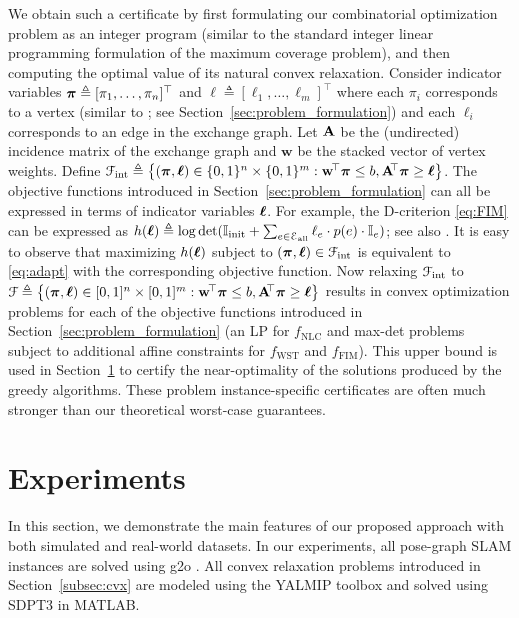 \documentclass[conference]{IEEEtran}
\begin{document}
We obtain such a certificate
by first
formulating our combinatorial optimization problem as an integer program (similar to the standard integer linear
programming formulation of the maximum
coverage problem), and then computing the optimal value of its natural
convex relaxation. 
Consider indicator variables $\boldsymbol\pi \triangleq [\pi_1,\dots,\pi_{n}]^\top$ and
$\boldsymbol{\ell}  \triangleq [\ell_1,\dots,\ell_m]^\top$ where each $\pi_i$
corresponds to a vertex (similar to \cite{Giamou18_ICRA}; see
Section~\ref{sec:problem_formulation}) and each $\ell_i$ corresponds to an edge
in the exchange graph. Let $\mathbf{A}$ be the (undirected) incidence matrix of the
exchange graph and $\mathbf{w}$ be the stacked vector of vertex weights. Define $\Fcal_{\text{int}} \triangleq \big\{(\ppp,\zz) \in \{0,1\}^n \times \{0,1\}^m
:\mathbf{w}^{\hspace{-0.05cm}\top}\ppp\leq
  b, \mathbf{A}^{\hspace{-0.1cm}\top}\ppp \geq \zz\big\}$. The objective
  functions introduced in Section~\ref{sec:problem_formulation} can all be
  expressed in terms of indicator variables $\boldsymbol{\ell}$. For example, the D-criterion \eqref{eq:FIM}
  can be expressed as $h(\boldsymbol{\ell}) \triangleq \log\det(\mathbb{I}_\text{init} + \sum_{e \in
	\mathcal{E}_\text{all}} \ell_e\cdot
  p(e) \cdot
  \mathbb{I}_e)$; see also \cite{kasra16wafr,carlone2017attention}. It is easy to observe that maximizing $h(\boldsymbol{\ell})$ subject to $(\boldsymbol\pi,\boldsymbol{\ell}) \in
  \mathcal{F}_\text{int}$ is equivalent to \ref{eq:adapt} with the corresponding
  objective function. Now relaxing $\mathcal{F}_\text{int}$ to 
  $\Fcal\triangleq \big\{(\ppp,\zz) \in [0,1]^n \times [0,1]^m
	:\mathbf{w}^{\hspace{-0.05cm}\top}\ppp\leq
  b, \mathbf{A}^{\hspace{-0.1cm}\top}\ppp \geq \zz\big\}$ results in convex
  optimization problems for each of the objective functions introduced in
  Section~\ref{sec:problem_formulation} (an LP for $f_\text{NLC}$ and
  max-det problems \cite{vandenberghe1998determinant} subject to additional
  affine constraints for $f_\text{WST}$ and $f_\text{FIM}$).
  This upper bound is used in Section~\ref{sec:experiments} to certify the
  near-optimality of the solutions produced by the greedy algorithms. These
  problem instance-specific certificates are often much stronger than our 
  theoretical worst-case guarantees.
  
  
\section{Experiments}
\label{sec:experiments}
In this section, we demonstrate the main features of our proposed approach with
both simulated and real-world datasets. In our experiments, all pose-graph SLAM
instances are solved using g2o \cite{kummerle2011g}. All convex relaxation
problems introduced in Section~\ref{subsec:cvx} are modeled using the YALMIP
toolbox \cite{Lofberg2004} and solved using SDPT3 \cite{Toh99sdpt3} in MATLAB.
\end{document}
